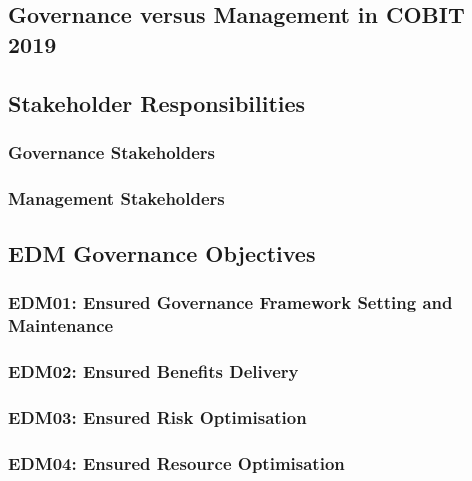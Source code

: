 
\subsection{Governance versus Management in COBIT 2019}



\subsection{Stakeholder Responsibilities}

\subsubsection{Governance Stakeholders}


\subsubsection{Management Stakeholders}



\subsection{EDM Governance Objectives}

\subsubsection{EDM01: Ensured Governance Framework Setting and Maintenance}

\subsubsection{EDM02: Ensured Benefits Delivery}

\subsubsection{EDM03: Ensured Risk Optimisation}

\subsubsection{EDM04: Ensured Resource Optimisation}

